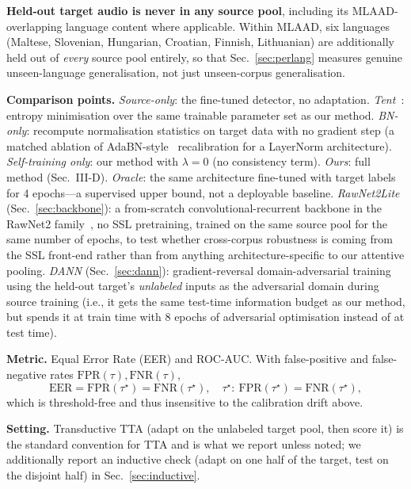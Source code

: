 \documentclass[conference]{IEEEtran}
\begin{document}
\textbf{Held-out target audio is never in any source pool}, including its
MLAAD-overlapping language content where applicable. Within MLAAD, six
languages (Maltese, Slovenian, Hungarian, Croatian, Finnish, Lithuanian) are
additionally held out of \emph{every} source pool entirely, so that
Sec.~\ref{sec:perlang} measures genuine unseen-language generalisation, not
just unseen-corpus generalisation.

\textbf{Comparison points.} \emph{Source-only}: the fine-tuned detector, no
adaptation. \emph{Tent}~\cite{tent}: entropy minimisation over the same
trainable parameter set as our method. \emph{BN-only}: recompute
normalisation statistics on target data with no gradient step (a matched
ablation of AdaBN-style~\cite{adabn} recalibration for a LayerNorm
architecture). \emph{Self-training only}: our method with $\lambda{=}0$ (no
consistency term). \emph{Ours}: full method (Sec.~III-D). \emph{Oracle}: the
same architecture fine-tuned with target labels for 4 epochs---a supervised
upper bound, not a deployable baseline. \emph{RawNet2Lite}
(Sec.~\ref{sec:backbone}): a from-scratch convolutional-recurrent backbone in
the RawNet2 family~\cite{rawnet2}, no SSL pretraining, trained on the same
source pool for the same number of epochs, to test whether cross-corpus
robustness is coming from the SSL front-end rather than from anything
architecture-specific to our attentive pooling. \emph{DANN}
(Sec.~\ref{sec:dann}): gradient-reversal domain-adversarial training~\cite{dann}
using the held-out target's \emph{unlabeled} inputs as the adversarial domain
during source training (i.e., it gets the same test-time information budget as
our method, but spends it at train time with 8 epochs of adversarial
optimisation instead of at test time).

\textbf{Metric.} Equal Error Rate (EER) and ROC-AUC. With false-positive and
false-negative rates $\mathrm{FPR}(\tau),\mathrm{FNR}(\tau)$,
\begin{equation}
\mathrm{EER}=\mathrm{FPR}(\tau^\star)=\mathrm{FNR}(\tau^\star),\quad
\tau^\star:\ \mathrm{FPR}(\tau^\star)=\mathrm{FNR}(\tau^\star),
\end{equation}
which is threshold-free and thus insensitive to the calibration drift above.

\textbf{Setting.} Transductive TTA (adapt on the unlabeled target pool, then
score it) is the standard convention for TTA and is what we report unless noted;
we additionally report an inductive check (adapt on one half of the target,
test on the disjoint half) in Sec.~\ref{sec:inductive}.
\end{document}
